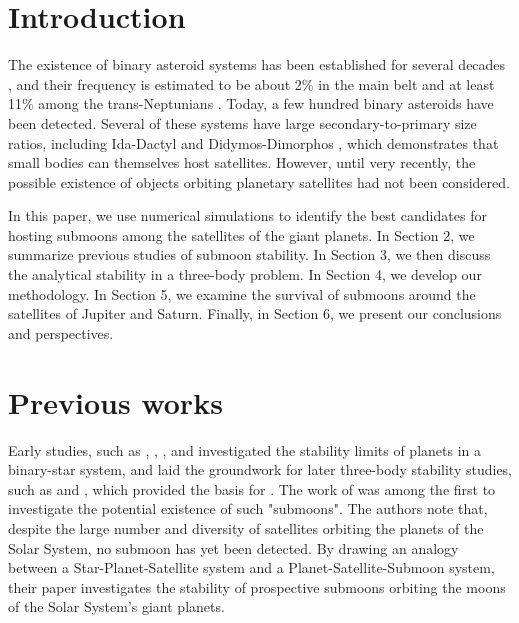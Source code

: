 \documentclass{aa}
\begin{document}

   \maketitle


\section{Introduction}

The existence of binary asteroid systems has been established for several decades \citep{BELTON1996185,PETIT1997}, and their frequency is estimated to be about 2\% in the main belt \citep{Merline_2002} and at least 11\% among the trans-Neptunians \citep{Stephenn_2006}. Today, a few hundred binary asteroids have been detected. Several of these systems have large secondary-to-primary size ratios, including Ida-Dactyl \citep{chapman1995} and Didymos-Dimorphos \citep{PRAVEC2006, NAIDU2020}, which demonstrates that small bodies can themselves host satellites. However, until very recently, the possible existence of objects orbiting planetary satellites had not been considered.

In this paper, we use numerical simulations to identify the best candidates for hosting submoons among  the satellites of the giant planets.
In Section 2, we summarize previous studies of submoon stability. In Section 3, we then discuss the analytical stability in a three-body problem. In Section 4, we develop our methodology. In Section 5, we examine the survival of submoons around the satellites of Jupiter and Saturn. Finally, in Section 6, we present our conclusions and perspectives.


\section{Previous works}

 Early studies, such as \cite{dvorak1986}, \cite{dvorak1989}, \cite{Holman1997}, and \cite{Holman1999} investigated the stability limits of planets in a binary-star system, and laid the groundwork for later three-body stability studies, such as \cite{Barnes_2002} and \cite{Domingos_2006}, which provided the basis for \cite{Kollmeier_2019}. The work of \cite{Kollmeier_2019} was among the first to investigate the potential existence of such "submoons". The authors note that, despite the large number and diversity of satellites orbiting the planets of the Solar System, no submoon has yet been detected. By drawing an analogy between a Star-Planet-Satellite system and a Planet-Satellite-Submoon system, their paper investigates the stability of prospective submoons orbiting the moons of the Solar System's giant planets. 
 
\end{document}
